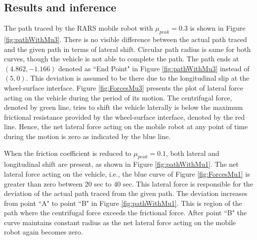 \subsection{Results and inference}
The path traced by the RARS mobile robot  with  $\mu_{peak} =0.3$ is shown in Figure \ref{fig:pathWithMu3}. There is no visible difference between the  actual path traced  and the given path in terms of lateral shift. Circular path radius is same for both curves, though the vehicle is not able to complete the path. The path ends at ${(4.862,-1.166)}$ denoted as ``End Point" in  Figure \ref{fig:pathWithMu3} instead of  ${(5,0)}$. This deviation is assumed to be there due to the longitudinal slip at the wheel-surface interface.  Figure \ref{fig:ForcesMu3} presents the plot of lateral force acting on the vehicle during the period of its motion. The centrifugal force, denoted by green line,  tries to shift the vehicle laterally is below the maximum frictional resistance provided by the wheel-surface interface, denoted by the red line. Hence, the net lateral force acting on the mobile robot at any point of time during the motion is zero as indicated by the blue line.

When the friction coefficient is reduced to  $\mu_{peak} =0.1$, both lateral and longitudinal shift are present, as shown in Figure \ref{fig:pathWithMu1}. The  net lateral force acting on the vehicle, i.e., the blue curve of Figure \ref{fig:ForcesMu1} is greater than zero between 20 sec to 40 sec. This lateral force is responsible for the deviation of the actual path traced from the given path. The deviation increases from point ``A" to point ``B" in Figure \ref{fig:pathWithMu1}. This is region of the path where the centrifugal force exceeds the frictional force. After point ``B" the curve maintains constant radius as the net lateral force acting on the mobile robot again becomes zero. 

